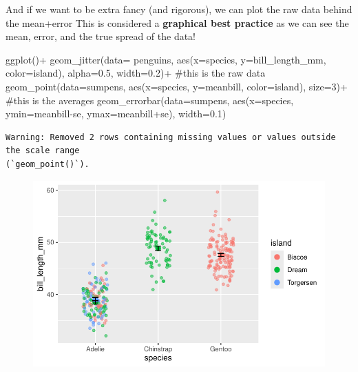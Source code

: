 \documentclass[
  letterpaper,
  DIV=11,
  numbers=noendperiod]{scrartcl}
\newenvironment{Shaded}{\begin{snugshade}}{\end{snugshade}}
\newcommand{\AttributeTok}[1]{\textcolor[rgb]{0.40,0.45,0.13}{#1}}
\newcommand{\CommentTok}[1]{\textcolor[rgb]{0.37,0.37,0.37}{#1}}
\newcommand{\DecValTok}[1]{\textcolor[rgb]{0.68,0.00,0.00}{#1}}
\newcommand{\FloatTok}[1]{\textcolor[rgb]{0.68,0.00,0.00}{#1}}
\newcommand{\FunctionTok}[1]{\textcolor[rgb]{0.28,0.35,0.67}{#1}}
\newcommand{\NormalTok}[1]{\textcolor[rgb]{0.00,0.23,0.31}{#1}}
\newcommand{\SpecialCharTok}[1]{\textcolor[rgb]{0.37,0.37,0.37}{#1}}
\begin{document}
And if we want to be extra fancy (and rigorous), we can plot the raw
data behind the mean+error This is considered a \textbf{graphical best
practice} as we can see the mean, error, and the true spread of the
data!

\begin{Shaded}
\begin{Highlighting}[]
\FunctionTok{ggplot}\NormalTok{()}\SpecialCharTok{+}
  \FunctionTok{geom\_jitter}\NormalTok{(}\AttributeTok{data=}\NormalTok{ penguins, }\FunctionTok{aes}\NormalTok{(}\AttributeTok{x=}\NormalTok{species, }\AttributeTok{y=}\NormalTok{bill\_length\_mm, }\AttributeTok{color=}\NormalTok{island), }\AttributeTok{alpha=}\FloatTok{0.5}\NormalTok{, }\AttributeTok{width=}\FloatTok{0.2}\NormalTok{)}\SpecialCharTok{+} \CommentTok{\#this is the raw data}
  \FunctionTok{geom\_point}\NormalTok{(}\AttributeTok{data=}\NormalTok{sumpens, }\FunctionTok{aes}\NormalTok{(}\AttributeTok{x=}\NormalTok{species, }\AttributeTok{y=}\NormalTok{meanbill, }\AttributeTok{color=}\NormalTok{island), }\AttributeTok{size=}\DecValTok{3}\NormalTok{)}\SpecialCharTok{+} \CommentTok{\#this is the averages}
  \FunctionTok{geom\_errorbar}\NormalTok{(}\AttributeTok{data=}\NormalTok{sumpens, }\FunctionTok{aes}\NormalTok{(}\AttributeTok{x=}\NormalTok{species, }\AttributeTok{ymin=}\NormalTok{meanbill}\SpecialCharTok{{-}}\NormalTok{se, }\AttributeTok{ymax=}\NormalTok{meanbill}\SpecialCharTok{+}\NormalTok{se), }\AttributeTok{width=}\FloatTok{0.1}\NormalTok{)}
\end{Highlighting}
\end{Shaded}

\begin{verbatim}
Warning: Removed 2 rows containing missing values or values outside the scale range
(`geom_point()`).
\end{verbatim}

\begin{figure}[H]

{\centering \includegraphics{Lab_2_files/figure-pdf/unnamed-chunk-19-1.pdf}

}

\end{figure}
\end{document}
